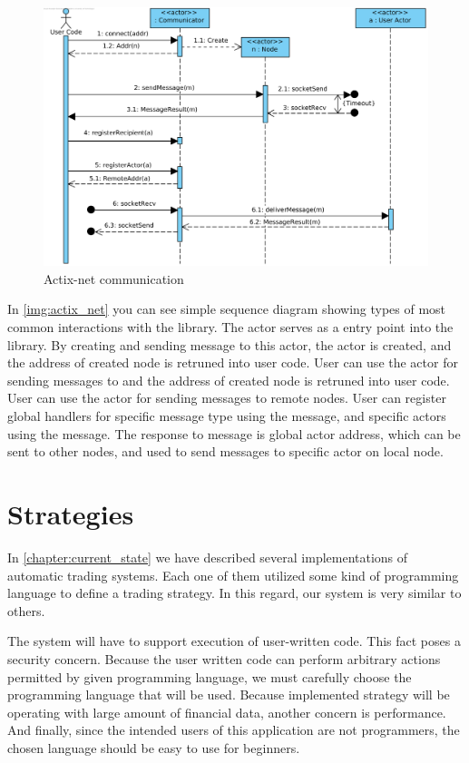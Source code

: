 \begin{figure}[H]
    \includegraphics[width=\textwidth]{obrazky-figures/Actix-net communication.png}
    \caption{Actix-net communication}
    \label{img:actix_net}
\end{figure}
In \autoref{img:actix_net} you can see simple sequence diagram showing types of most common interactions with the library. The 
actor serves as a entry point into the library. By creating and sending  message to this actor, the  actor is created,
and the address of created node is retruned into user code. User can use the  actor for sending messages to
and the address of created node is retruned into user code. User can use the  actor for sending messages to
remote nodes. User can register global handlers for specific message type
using the  message, and specific actors using the  message. The response to 
message is global actor address, which can be sent to other nodes, and used to send messages to specific actor on local node.

\section{Strategies}
In \autoref{chapter:current_state} we have described several implementations of automatic trading systems. Each one of them
utilized some kind of programming language to define a trading strategy. In this regard, our system is very similar to others.

The system will have to support execution of user-written code. This fact poses a security concern. Because the user
written code can perform arbitrary actions permitted by given programming language, we must carefully choose the programming
language that will be used. Because implemented strategy will be operating with large amount of financial data, another
concern is performance. And finally, since the intended users of this application are not programmers, the chosen language
should be easy to use for beginners.

